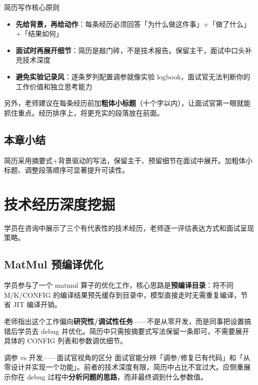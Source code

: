 \documentclass[a4paper]{article}
\begin{document}
\begin{importantbox}{简历写作核心原则}
\begin{itemize}
\item \textbf{先给背景，再给动作}：每条经历必须回答「为什么做这件事」+「做了什么」+「结果如何」
\item \textbf{面试时再展开细节}：简历是敲门砖，不是技术报告。保留主干，面试中口头补充技术深度
\item \textbf{避免实验记录风}：逐条罗列配置调参就像实验 logbook，面试官无法判断你的工作价值和独立思考能力
\end{itemize}
\end{importantbox}

另外，老师建议在每条经历前加\textbf{粗体小标题}（十个字以内），让面试官第一眼就能抓住重点。经历排序上，将更充实的段落放在前面。

\subsection{本章小结}
简历采用摘要式+背景驱动的写法，保留主干、预留细节在面试中展开。加粗体小标题、调整段落顺序可显著提升可读性。

\section{技术经历深度挖掘}

学员在咨询中展示了三个有代表性的技术经历，老师逐一评估表达方式和面试呈现策略。

\subsection{MatMul 预编译优化}

学员参与了一个 matmul 算子的优化工作，核心思路是\textbf{预编译目录}：将不同 M/K/CONFIG 的编译结果预先缓存到目录中，模型直接走时无需重复编译，节省 JIT 编译开销。

老师指出这个工作偏向\textbf{研究性/调试性任务}——不是从零开发，而是同事把设置搞错后学员去 debug 并优化。简历中只需按摘要式写法保留一条即可，不需要展开具体的 CONFIG 列表和参数调优细节。

\begin{warningbox}{调参 vs 开发——面试官视角的区分}
面试官能分辨「调参/修复已有代码」和「从零设计并实现一个功能」。前者的技术深度有限，简历中占比不宜过大。应侧重展示你在 debug 过程中\textbf{分析问题的思路}，而非最终调到什么参数值。
\end{warningbox}
\end{document}
